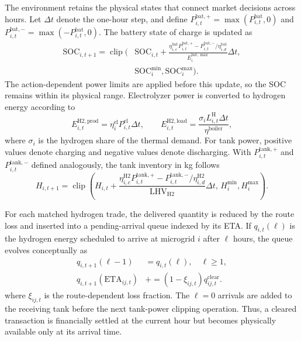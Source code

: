 \documentclass[final,5p,times]{elsarticle}
\begin{document}
The environment retains the physical states that connect market decisions across hours. Let $\Delta t$ denote the one-hour step, and define $P_{i,t}^{\mathrm{bat},+}=\max(P_{i,t}^{\mathrm{bat}},0)$ and $P_{i,t}^{\mathrm{bat},-}=\max(-P_{i,t}^{\mathrm{bat}},0)$. The battery state of charge is updated as
\begin{equation}
  \label{eq:soc_transition}
  \begin{aligned}
  \mathrm{SOC}_{i,t+1}=\operatorname{clip}\!\bigg(&\mathrm{SOC}_{i,t}+
  \frac{\eta_{i,c}^{\mathrm{bat}}P_{i,t}^{\mathrm{bat},+}-P_{i,t}^{\mathrm{bat},-}/\eta_{i,d}^{\mathrm{bat}}}{E_i^{\mathrm{bat},\max}}\Delta t,\\[-1mm]
  &\mathrm{SOC}_i^{\min},\mathrm{SOC}_i^{\max}\bigg).
  \end{aligned}
\end{equation}
The action-dependent power limits are applied before this update, so the SOC remains within its physical range. Electrolyzer power is converted to hydrogen energy according to
\begin{equation}
  \label{eq:electrolyzer_transition}
  E_{i,t}^{\mathrm{H2,prod}}=\eta_i^{\mathrm{el}}P_{i,t}^{\mathrm{el}}\Delta t,
  \qquad
  E_{i,t}^{\mathrm{H2,load}}=\frac{\sigma_i L_{i,t}^{\mathrm{H}}\Delta t}{\eta^{\mathrm{boiler}}},
\end{equation}
where $\sigma_i$ is the hydrogen share of the thermal demand. For tank power, positive values denote charging and negative values denote discharging. With $P_{i,t}^{\mathrm{tank},+}$ and $P_{i,t}^{\mathrm{tank},-}$ defined analogously, the tank inventory in kg follows
\begin{equation}
  \label{eq:h2_tank_transition}
  H_{i,t+1}=\operatorname{clip}\!\left(H_{i,t}+
  \frac{\eta_{i,c}^{\mathrm{H2}}P_{i,t}^{\mathrm{tank},+}-P_{i,t}^{\mathrm{tank},-}/\eta_{i,d}^{\mathrm{H2}}}{\mathrm{LHV}_{\mathrm{H2}}}\Delta t,\,
  H_i^{\min},H_i^{\max}\right).
\end{equation}

For each matched hydrogen trade, the delivered quantity is reduced by the route loss and inserted into a pending-arrival queue indexed by its ETA. If $q_{i,t}(\ell)$ is the hydrogen energy scheduled to arrive at microgrid $i$ after $\ell$ hours, the queue evolves conceptually as
\begin{equation}
  \label{eq:pending_transition}
  \begin{aligned}
  q_{i,t+1}(\ell-1)&=q_{i,t}(\ell),\quad \ell\geq1,\\[-1mm]
  q_{i,t+1}(\mathrm{ETA}_{ij,t})&\mathrel{+}=(1-\xi_{ij,t})q_{ij,t}^{\mathrm{clear}}.
  \end{aligned}
\end{equation}
where $\xi_{ij,t}$ is the route-dependent loss fraction. The $\ell=0$ arrivals are added to the receiving tank before the next tank-power clipping operation. Thus, a cleared transaction is financially settled at the current hour but becomes physically available only at its arrival time.
\end{document}
